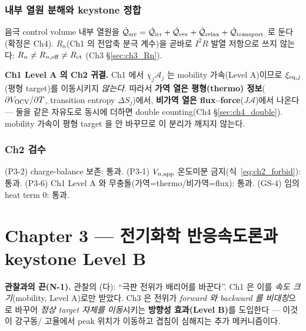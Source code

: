\section{내부 열원 분해와 keystone 정합}\label{sec:ch2_heat}
음극 control volume 내부 열원을
$\dot{\mathcal Q}_{\mathrm{src}}=\dot{\mathcal Q}_{\mathrm{irr}}+\dot{\mathcal Q}_{\mathrm{rev}}+\dot{\mathcal Q}_{\mathrm{relax}}+\dot{\mathcal Q}_{\mathrm{transport}}$
로 둔다(확정은 Ch4). $R_n$(Ch1 의 전압축 분극 계수)을 곧바로 $I^2R$ 발열 저항으로 쓰지 않는다:
$R_n\ne R_{n,\mathrm{eff}}\ne R_{\mathrm{ct}}$ (Ch3 \S\ref{sec:ch3_Rn}).

\begin{keybox}
\textbf{Ch1 Level A 의 Ch2 귀결.} Ch1 에서 $\chi_j\mathcal A_j$ 는 mobility 가속(Level A)이므로
$\xi_{\mathrm{eq},j}$(평형 target)를 이동시키지 \emph{않는다}. 따라서 \textbf{가역 열은 평형(thermo)
정보}($\partial V_{\mathrm{OCV}}/\partial T$, transition entropy $\Delta S_j$)에서, \textbf{비가역 열은
flux--force}($J\mathcal A$)에서 나온다 — 둘을 같은 자유도로 동시에 더하면 double counting(Ch4
\S\ref{sec:ch4_double}). mobility 가속이 평형 target 을 안 바꾸므로 이 분리가 깨지지 않는다.
\end{keybox}

\section{Ch2 검수}\label{sec:ch2_check}
{\small (P3-2) charge-balance 보존: 통과. (P3-1) $V_{n,\mathrm{app}}$ 온도미분 금지(식~\eqref{eq:ch2_forbid}):
통과. (P3-6) Ch1 Level A 와 무충돌(가역=thermo/비가역=flux): 통과. (GS-4) 임의 heat term 0: 통과.}

\part*{Chapter 3 — 전기화학 반응속도론과 keystone Level B}
\setcounter{section}{0}

\begin{anchorbox}
\textbf{관찰과의 끈(N-1).} 관찰의 (다): ``극판 전위가 배리어를 바꾼다''. Ch1 은 이를 \emph{속도
크기}(mobility, Level A)로만 받았다. Ch3 은 전위가 \emph{forward 와 backward 를 비대칭}으로 바꾸어
\emph{정상 target 자체를 이동}시키는 \textbf{방향성 효과(Level B)}를 도입한다 — 이것이 강구동/
고율에서 peak 위치가 이동하고 겹침이 심해지는 추가 메커니즘이다.
\end{anchorbox}

